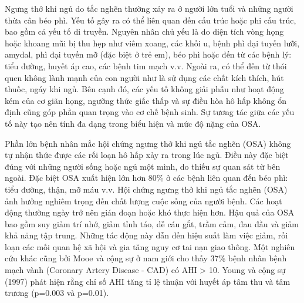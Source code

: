 Ngưng thở khi ngủ do tắc nghẽn thường xảy ra ở người lớn tuổi và những người thừa cân béo phì. Yếu tố gây ra có thể liên quan đến cấu trúc hoặc phi cấu trúc, bao gồm cả yếu tố di truyền. Nguyên nhân chủ yếu là do diện tích vòng họng hoặc khoang mũi bị thu hẹp như viêm xoang, các khối u, bệnh phì đại tuyến lưỡi, amydal, phì đại tuyến mỡ (đặc biệt ở trẻ em), béo phì hoặc đến từ các bệnh lý: tiểu đường, huyết áp cao, các bệnh tim mạch v.v\cite{wright1997health}. Ngoài ra, có thể đến từ thói quen không lành mạnh của con người như là sử dụng các chất kích thích, hút thuốc, ngáy khi ngủ\cite{reason_osa}\cite{reasonOsa}. Bên cạnh đó, các yếu tố không giải phẫu như hoạt động kém của cơ giãn họng, ngưỡng thức giấc thấp và sự điều hòa hô hấp không ổn định cũng góp phần quan trọng vào cơ chế bệnh sinh. Sự tương tác giữa các yếu tố này tạo nên tính đa dạng trong biểu hiện và mức độ nặng của OSA.



Phần lớn bệnh nhân mắc hội chứng ngưng thở khi ngủ tắc nghẽn (\gls{OSA}) không tự nhận thức được các rối loạn hô hấp xảy ra trong lúc ngủ. Điều này đặc biệt đúng với những người sống hoặc ngủ một mình, do thiếu sự quan sát từ bên ngoài. Đặc biệt OSA xuất hiện lớn hơn 80\% ở các bệnh liên quan đến béo phì: tiểu đường, thận, mỡ máu v.v\cite{wright1997health}. Hội chứng ngưng thở khi ngủ tắc nghẽn (OSA) ảnh hưởng nghiêm trọng đến chất lượng cuộc sống của người bệnh. Các hoạt động thường ngày trở nên gián đoạn hoặc khó thực hiện hơn. Hậu quả của OSA bao gồm suy giảm trí nhớ, giảm tỉnh táo, dễ cáu gắt, trầm cảm, đau đầu và giảm khả năng tập trung\cite{flemons1997quality}. Những tác động này dẫn đến hiệu suất làm việc giảm, rối loạn các mối quan hệ xã hội và gia tăng nguy cơ tai nạn giao thông. Một nghiên cứu khác cũng bởi Mooe và cộng sự\cite{mooe1996sleep} ở nam giới cho thấy 37\% bệnh nhân bệnh mạch vành (Coronary Artery Disease - CAD) có AHI > 10. Young và cộng sự (1997) phát hiện rằng chỉ số AHI tăng tỉ lệ thuận với huyết áp tâm thu và tâm trương (p=0.003 và p=0.01)\cite{young1997population}.

